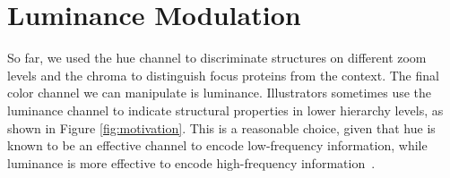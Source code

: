 \documentclass[review,journal]{vgtc}         %
\begin{document}
	
	
	
	\section{Luminance Modulation}
	\label{sec:luminance}
	
	So far, we used the hue channel to discriminate structures on different zoom levels and the chroma to distinguish focus proteins from the context. 
	The final color channel we can manipulate is luminance. 
	Illustrators sometimes use the luminance channel to indicate structural properties in lower hierarchy levels, as shown in Figure \ref{fig:motivation}. 
	This is a reasonable choice, given that hue is known to be an effective channel to encode low-frequency information, while luminance is more effective to encode high-frequency information~\cite{bergman1995rule}. 
	
\end{document}
